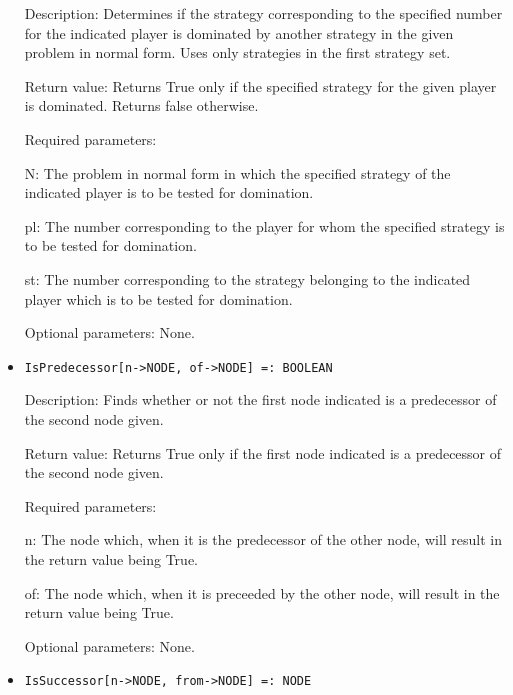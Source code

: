 \begin{itemize}
\bd
\item
[Description:] Determines if the strategy corresponding to the
specified number for the indicated player is dominated by another
strategy in the given problem in normal form.  Uses only strategies in
the first strategy set.
\item
[Return value:] Returns True only if the specified strategy for the
given player is dominated.  Returns false otherwise.
\item
[Required parameters:]\hfil\null

\bd
\item
[N:] The problem in normal form in which the specified strategy of the
indicated player is to be tested for domination.
\item
[pl:] The number corresponding to the player for whom the specified
strategy is to be tested for domination.
\item
[st:] The number corresponding to the strategy belonging to the
indicated player which is to be tested for domination.
\ed

\item
[Optional parameters:] None.
\ed

\item
\protect \large \begin{verbatim}
IsPredecessor[n->NODE, of->NODE] =: BOOLEAN
\end{verbatim}\normalsize

\bd
\item
[Description:] Finds whether or not the first node indicated is a
predecessor of the second node given.
\item
[Return value:] Returns True only if the first node indicated is a
predecessor of the second node given.
\item
[Required parameters:]\hfil\null

\bd
\item
[n:] The node which, when it is the predecessor of the other node,
will result in the return value being True.
\item
[of:] The node which, when it is preceeded by the other node, will
result in the return value being True.
\ed

\item
[Optional parameters:] None.
\ed

\item
\protect \large \begin{verbatim}
IsSuccessor[n->NODE, from->NODE] =: NODE
\end{verbatim}\normalsize


\end{itemize}

